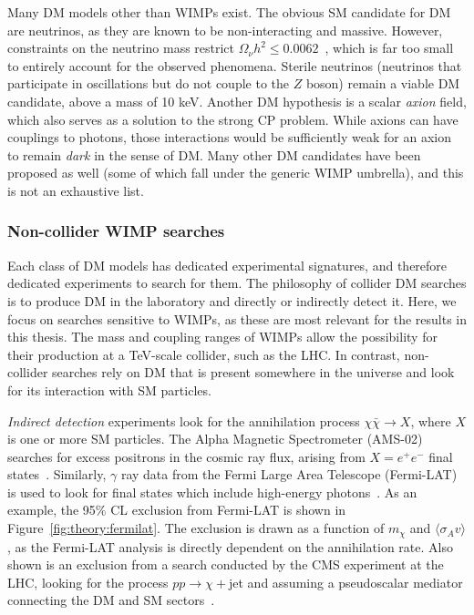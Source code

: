Many DM models other than WIMPs exist.
The obvious SM candidate for DM are neutrinos, as they are known to be non-interacting and massive.
However, constraints on the neutrino mass restrict ${\Omega_\nu h^2 \leq 0.0062}$~\cite{pdg}, which is far too small to entirely account for the observed phenomena. 
Sterile neutrinos (neutrinos that participate in oscillations but do not couple to the ${Z}$ boson) remain a viable DM candidate, above a mass of 10 keV.
Another DM hypothesis is a scalar \emph{axion} field, which also serves as a solution to the strong CP problem.
While axions can have couplings to photons, those interactions would be sufficiently weak for an axion to remain \emph{dark} in the sense of DM.
Many other DM candidates have been proposed as well (some of which fall under the generic WIMP umbrella), and this is not an exhaustive list.

\subsubsection{Non-collider WIMP searches}

Each class of DM models has dedicated experimental signatures, and therefore dedicated experiments to search for them.
The philosophy of collider DM searches is to produce DM in the laboratory and directly or indirectly detect it.
Here, we focus on searches sensitive to WIMPs, as these are most relevant for the results in this thesis.
The mass and coupling ranges of WIMPs allow the possibility for their production at a TeV-scale collider, such as the LHC.
In contrast, non-collider searches rely on DM that is present somewhere in the universe and look for its interaction with SM particles.

\emph{Indirect detection} experiments look for the annihilation process ${\chi\bar\chi\rightarrow X}$, where ${X}$ is one or more SM particles.
The Alpha Magnetic Spectrometer (AMS-02) searches for excess positrons in the cosmic ray flux, arising from ${X=e^+e^-}$ final states~\cite{ams}. 
Similarly, ${\gamma}$ ray data from the Fermi Large Area Telescope (Fermi-LAT) is used to look for final states which include high-energy photons~\cite{fermilat}.
As an example, the 95\% CL exclusion from Fermi-LAT is shown in Figure~\ref{fig:theory:fermilat}.
The exclusion is drawn as a function of ${m_\chi}$ and ${\langle \sigma_A v\rangle}$, as the Fermi-LAT analysis is directly dependent on the annihilation rate.
Also shown is an exclusion from a search conducted by the CMS experiment at the LHC, looking for the process ${pp\rightarrow \chi+}$jet and assuming a pseudoscalar mediator connecting the DM and SM sectors~\cite{monojet}.

